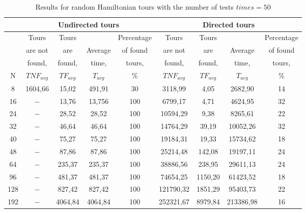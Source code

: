 \documentclass[runningheads]{llncs}
\begin{document}
\begin{table}[!htbp]
\centering
\caption{%
\label{tabl:table3}Results for random Hamiltonian tours with the number of tests $times = 50$}
\begin{tabular}{|*{9}{c|}}
\hline
& \multicolumn{4}{c|}{Undirected tours} &  \multicolumn{4}{c|}{Directed tours} \\ 
\hline
  & Tours & Tours &  & Percentage & Tours & Tours &  & Percentage \\
  & are not & are & Average & of found & are not & are & Average & of found \\
  & found, & found, & time, & tours, & found, & found, & time, & tours, \\
N & $TNF_{avg}$ & $TF_{avg}$ & $T_{avg}$ & \% & $TNF_{avg}$ & $TF_{avg}$ & $T_{avg}$ & \% \\ 
\hline
8 & 1604,66 & 15,02 & 491,91 & 30 & 3118,99 & 4,05 & 2682,90 & 14 \\ 
\hline
16 & $-$ & 13,76 & 13,756 & 100 & 6799,17 & 4,71 & 4624,95 & 32 \\ 
\hline
24 & $-$ & 28,52 & 28,52 & 100 & 10594,29 & 9,38 & 8265,61 & 22 \\ 
\hline
32 & $-$ & 46,64 & 46,64 & 100 & 14764,29 & 39,19 & 10052,26 & 32 \\ 
\hline
40 & $-$ & 75,27 & 75,27 & 100 & 19184,31 & 19,33 & 15734,62 & 18 \\ 
\hline
48 & $-$ & 87,86 & 87,86 & 100 & 25214,48 & 142,08 & 19197,11 & 24 \\ 
\hline
64 & $-$ & 235,37 & 235,37 & 100 & 38886,56 & 238,95 & 29611,13 & 24 \\ 
\hline
96 & $-$ & 481,37 & 481,37 & 100 & 74654,25 & 1150,20 & 61423,52 & 18 \\ 
\hline
128 & $-$ & 827,42 & 827,42 & 100 & 121790,32 & 1851,29 & 95403,73 & 22 \\ 
\hline
192 & $-$ & 4064,84 & 4064,84 & 100 & 252321,67 & 8979,84 & 213386,98 & 16 \\ 
\hline
\end{tabular}
\end{table}
\end{document}

